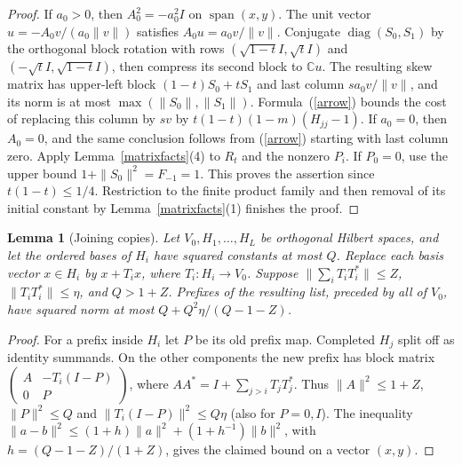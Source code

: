 \documentclass[reqno,a4paper,12pt]{amsart}
\newtheorem{lemma}[theorem]{Lemma}
\newcommand{\C}{\mathbb C}
\newcommand{\spn}{\operatorname{span}}
\newcommand{\diag}{\operatorname{diag}}
\begin{document}
\begin{proof}
If $a_0>0$, then $A_0^2=-a_0^2I$ on $\spn(x,y)$.
The unit vector $u=-A_0v/(a_0\|v\|)$ satisfies
$A_0u=a_0v/\|v\|$.
Conjugate $\diag(S_0,S_1)$ by the orthogonal block rotation with rows
$(\sqrt{1-t}I,\sqrt t I)$ and $(-\sqrt t I,\sqrt{1-t}I)$,
then compress its second block to $\C u$.
The resulting skew matrix has upper-left block $(1-t)S_0+tS_1$ and
last column $sa_0v/\|v\|$, and its norm is at most
$\max(\|S_0\|,\|S_1\|)$.
Formula~(\ref{arrow}) bounds the cost of replacing this column by $sv$
by $t(1-t)(1-m)(H_{jj}-1)$. If $a_0=0$, then $A_0=0$, and the same
conclusion follows from (\ref{arrow}) starting with last column zero.
Apply Lemma~\ref{matrixfacts}(4) to $R_t$ and the nonzero $P_i$.
If $P_0=0$, use the upper bound $1+\|S_0\|^2=F_{-1}=1$.
This proves the assertion since $t(1-t)\le1/4$.
Restriction to the finite product family and then removal of its
initial constant by Lemma~\ref{matrixfacts}(1) finishes the proof.
\end{proof}

\begin{lemma}[Joining copies]\label{joincopies}
Let $V_0,H_1,\ldots,H_L$ be orthogonal Hilbert spaces, and let the
ordered bases of $H_i$ have squared constants at most $Q$.
Replace each basis vector $x\in H_i$ by $x+T_ix$, where $T_i:H_i\to V_0$.
Suppose $\|\sum_iT_iT_i^*\|\le Z$, $\|T_iT_i^*\|\le\eta$, and $Q>1+Z$.
Prefixes of the resulting list, preceded by all of $V_0$, have squared
norm at most $Q+Q^2\eta/(Q-1-Z)$.
\end{lemma}
\begin{proof}
For a prefix inside $H_i$ let $P$ be its old prefix map.
Completed $H_j$ split off as identity summands. On the other components
the new prefix has block matrix
$\left(\begin{smallmatrix}A&-T_i(I-P)\\0&P\end{smallmatrix}\right)$,
where $AA^*=I+\sum_{j>i}T_jT_j^*$.
Thus $\|A\|^2\le1+Z$, $\|P\|^2\le Q$ and
$\|T_i(I-P)\|^2\le Q\eta$ (also for $P=0,I$).
The inequality $\|a-b\|^2\le(1+h)\|a\|^2+(1+h^{-1})\|b\|^2$,
with $h=(Q-1-Z)/(1+Z)$, gives the claimed bound on a vector $(x,y)$.
\end{proof}
\end{document}
